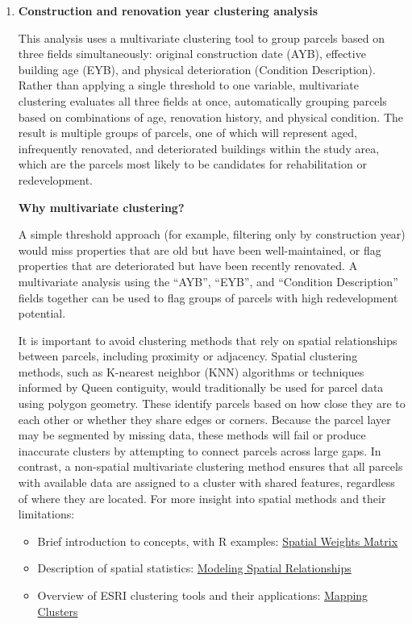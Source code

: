 \documentclass[
  letterpaper,
  DIV=11,
  numbers=noendperiod]{scrreprt}
\providecommand{\tightlist}{%
  \setlength{\itemsep}{0pt}\setlength{\parskip}{0pt}}
\begin{document}
\begin{enumerate}
\def\labelenumi{\arabic{enumi}.}
\item
  \textbf{Construction and renovation year clustering analysis}

  This analysis uses a multivariate clustering tool to group parcels
  based on three fields simultaneously: original construction date
  (AYB), effective building age (EYB), and physical deterioration
  (Condition Description). Rather than applying a single threshold to
  one variable, multivariate clustering evaluates all three fields at
  once, automatically grouping parcels based on combinations of age,
  renovation history, and physical condition. The result is multiple
  groups of parcels, one of which will represent aged, infrequently
  renovated, and deteriorated buildings within the study area, which are
  the parcels most likely to be candidates for rehabilitation or
  redevelopment.

  \textbf{Why multivariate clustering?}

  A simple threshold approach (for example, filtering only by
  construction year) would miss properties that are old but have been
  well-maintained, or flag properties that are deteriorated but have
  been recently renovated. A multivariate analysis using the ``AYB'',
  ``EYB'', and ``Condition Description'' fields together can be used to
  flag groups of parcels with high redevelopment potential.

  It is important to avoid clustering methods that rely on spatial
  relationships between parcels, including proximity or adjacency.
  Spatial clustering methods, such as K-nearest neighbor (KNN)
  algorithms or techniques informed by Queen contiguity, would
  traditionally be used for parcel data using polygon geometry. These
  identify parcels based on how close they are to each other or whether
  they share edges or corners. Because the parcel layer may be segmented
  by missing data, these methods will fail or produce inaccurate
  clusters by attempting to connect parcels across large gaps. In
  contrast, a non-spatial multivariate clustering method ensures that
  all parcels with available data are assigned to a cluster with shared
  features, regardless of where they are located. For more insight into
  spatial methods and their limitations:

  \begin{itemize}
  \tightlist
  \item
    Brief introduction to concepts, with R examples:
    \href{https://cran.r-project.org/web/packages/geostan/vignettes/spatial-weights-matrix.html}{Spatial
    Weights Matrix}
  \item
    Description of spatial statistics:
    \href{https://doc.esri.com/en/arcgis-pro/latest/tool-reference/spatial-statistics/modeling-spatial-relationships.html}{Modeling
    Spatial Relationships}
  \item
    Overview of ESRI clustering tools and their applications:
    \href{https://doc.esri.com/en/arcgis-pro/latest/tool-reference/spatial-statistics/an-overview-of-the-mapping-clusters-toolset.html}{Mapping
    Clusters}
  \end{itemize}


\end{enumerate}
\end{document}
